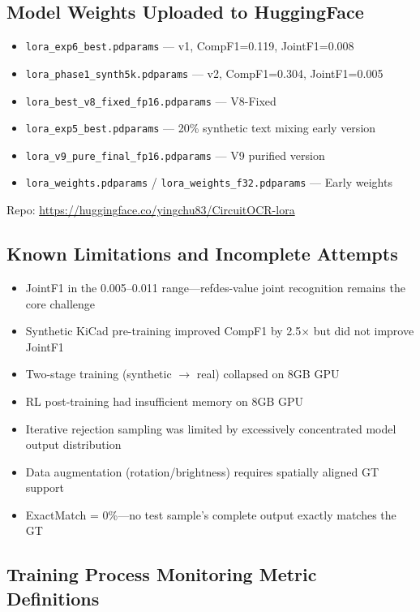\subsection{Model Weights Uploaded to HuggingFace}

\begin{itemize}[nosep]
    \item \texttt{lora\_exp6\_best.pdparams} --- v1, CompF1=0.119, JointF1=0.008
    \item \texttt{lora\_phase1\_synth5k.pdparams} --- v2, CompF1=0.304, JointF1=0.005
    \item \texttt{lora\_best\_v8\_fixed\_fp16.pdparams} --- V8-Fixed
    \item \texttt{lora\_exp5\_best.pdparams} --- 20\% synthetic text mixing early version
    \item \texttt{lora\_v9\_pure\_final\_fp16.pdparams} --- V9 purified version
    \item \texttt{lora\_weights.pdparams} / \texttt{lora\_weights\_f32.pdparams} --- Early weights
\end{itemize}

Repo: \url{https://huggingface.co/yingchu83/CircuitOCR-lora}

\subsection{Known Limitations and Incomplete Attempts}

\begin{itemize}[nosep]
    \item JointF1 in the 0.005--0.011 range---refdes-value joint recognition remains the core challenge
    \item Synthetic KiCad pre-training improved CompF1 by 2.5$\times$ but did not improve JointF1
    \item Two-stage training (synthetic $\to$ real) collapsed on 8GB GPU
    \item RL post-training had insufficient memory on 8GB GPU
    \item Iterative rejection sampling was limited by excessively concentrated model output distribution
    \item Data augmentation (rotation/brightness) requires spatially aligned GT support
    \item ExactMatch = 0\%---no test sample's complete output exactly matches the GT
\end{itemize}

\subsection{Training Process Monitoring Metric Definitions}

